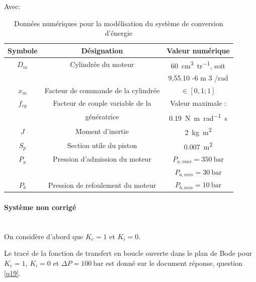 Avec:
\begin{table}[ht!]
\begin{center}
\begin{tabular}{|c|c|c|}
\hline
Symbole & Désignation & Valeur numérique \\
\hline
$D_m$ & Cylindrée du moteur & \SI{60}{\cm^3 tr^{-1}}, soit \\
& & 9,55.10 -6 m 3 /rad \\
\hline
$x_m$ & Facteur de commande de la cylindrée &  $\in[0,1 ; 1]$\\
\hline
$f_{cg}$ & Facteur de couple variable de la &  Valeur maximale :\\
 & génératrice &  \SI{0,19}{\N\m rad^{-1}\s}\\
\hline
$J$ & Moment d'inertie &  \SI{2}{\kg\m^2} \\
\hline
$S_p$ & Section utile du piston &  \SI{0,007}{\m^2} \\
\hline
$P_a$ & Pression d'admission du moteur &  $P_{a,max}=\SI{350}{\bar}$\\
 & &  $P_{a,min}=\SI{30}{\bar}$\\
\hline
$P_b$ & Pression de refoulement du moteur &  $P_{b,min}=\SI{10}{\bar}$\\
\hline
\end{tabular}
\end{center}
  \caption{Données numériques pour la modélisation du système de conversion d'énergie}
\label{tab03}
\end{table}

\paragraph{Système non corrigé}~\ \\

On considère d'abord que $K_c=1$ et $K_i=0$.



Le tracé de la fonction de transfert en boucle ouverte dans le plan de Bode pour $K_c=1$, $K_i=0$ et $\Delta P=\SI{100}{\bar}$ est donné sur le document réponse, question \ref{q19}.

